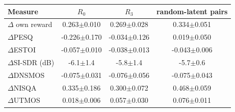 \begin{tabular}{l c c c}
\toprule
Measure & $R_0$ & $R_3$ & random-latent pairs \\
\midrule
$\Delta$ own reward & 0.263$\pm$0.010 & 0.269$\pm$0.028 & 0.334$\pm$0.051 \\
$\Delta$PESQ & -0.226$\pm$0.170 & -0.034$\pm$0.126 & 0.019$\pm$0.050 \\
$\Delta$ESTOI & -0.057$\pm$0.010 & -0.038$\pm$0.013 & -0.043$\pm$0.006 \\
$\Delta$SI-SDR (dB) & -6.1$\pm$1.4 & -5.8$\pm$1.4 & -5.7$\pm$0.6 \\
$\Delta$DNSMOS & -0.075$\pm$0.031 & -0.076$\pm$0.056 & -0.075$\pm$0.043 \\
$\Delta$NISQA & 0.335$\pm$0.186 & 0.300$\pm$0.072 & 0.468$\pm$0.059 \\
$\Delta$UTMOS & 0.018$\pm$0.006 & 0.057$\pm$0.030 & 0.076$\pm$0.011 \\
\bottomrule
\end{tabular}
